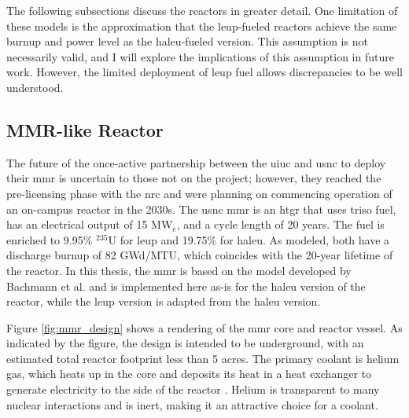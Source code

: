 The following subsections discuss the reactors in greater detail. One limitation of these models is the approximation that the \gls{leup}-fueled reactors achieve the same burnup and power level as the \gls{haleu}-fueled version. This assumption is not necessarily valid, and I will explore the implications of this assumption in future work. However, the limited deployment of \gls{leup} fuel allows discrepancies to be well understood.

\subsection{MMR-like Reactor}
\label{sec:mmr}

The future of the once-active partnership between the \gls{uiuc} and \gls{usnc} to deploy their \gls{mmr} is uncertain to those not on the project; however, they reached the pre-licensing phase with the \gls{nrc} and were planning on commencing operation of an on-campus reactor in the 2030s. The \gls{usnc} \gls{mmr} is an \gls{htgr} that uses \gls{triso} fuel, has an electrical output of 15 MW$_e$, and a cycle length of 20 years. The fuel is enriched to 9.95\% $^{235}$U for \gls{leup} and 19.75\% for \gls{haleu}. As modeled, both have a discharge burnup of 82 GWd/MTU, which coincides with the 20-year lifetime of the reactor. In this thesis, the \gls{mmr} is based on the model developed by Bachmann et al. \cite{bachmann_mmr_like_2023} and is implemented here as-is for the \gls{haleu} version of the reactor, while the \gls{leup} version is adapted from the \gls{haleu} version.

Figure \ref{fig:mmr_design} shows a rendering of the \gls{mmr} core and reactor vessel. As indicated by the figure, the design is intended to be underground, with an estimated total reactor footprint less than 5 acres. The primary coolant is helium gas, which heats up in the core and deposits its heat in a heat exchanger to generate electricity to the side of the reactor \cite{usnc_chalk_river}. Helium is transparent to many nuclear interactions and is inert, making it an attractive choice for a coolant.

